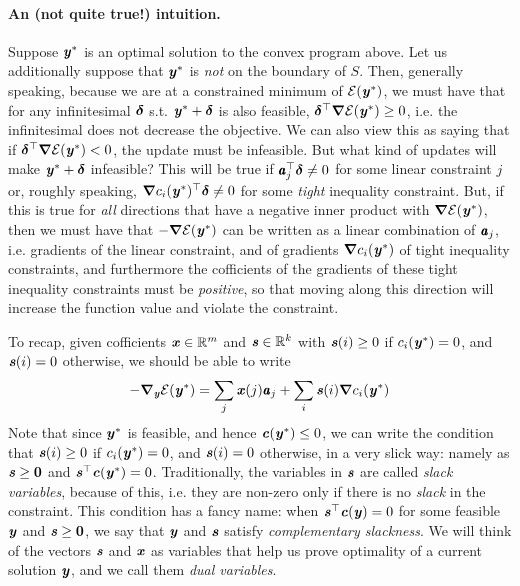 {\paragraph{An (not quite true!) intuition.}
Suppose $\yy^*$ is an optimal solution to the convex program above.
Let us additionally suppose that $\yy^*$ is \emph{not} on the boundary
of $S$.
Then, generally speaking, because we are at a constrained minimum of
$\energy(\yy^*)$, we must have that for any infinitesimal $\ddelta$
s.t. $\yy^*+\ddelta$ is also feasible, $\ddelta^{\top} \grad
\energy(\yy^*) \geq 0$, i.e. the infinitesimal does not decrease the
objective.
We can also view this as saying that if $\ddelta^{\top} \grad
\energy(\yy^*)  < 0$, the update must be infeasible.
But what kind of updates will make $\yy^*+\ddelta$ infeasible?
This will be true if $\aa_j^{\top} \ddelta \neq 0$ for some linear
constraint $j$ or, roughly speaking, $\grad c_i(\yy^*)^{\top} \ddelta \neq 0$ for some
\emph{tight} inequality constraint.
But, if this is true for \emph{all} directions that have a negative
inner product with $\grad \energy(\yy^*)$, then we must have that
$-\grad \energy(\yy^*)$ can be written as a linear combination of
$\aa_j$, i.e. gradients of the linear constraint, and of
gradients $\grad c_i(\yy^*)$ of tight inequality constraints,
and furthermore the cofficients of the gradients of these tight
inequality constraints must be \emph{positive}, so that moving along
this direction will increase the function value and violate the constraint. 

To recap, given cofficients $\xx \in \R^m$ and $\ss \in \R^k$ with
$\ss(i) \geq 0$ if $c_i(\yy^*) = 0$, and $\ss(i) = 0$ otherwise, we
should be able to write
\begin{align}
  -\grad_{\yy}\calE(\yy^*) = \sum_{j} \xx(j) \aa_j + \sum_{i}
  \ss(i)\grad c_i(\yy^*)
  \label{eq:compSlackIntro}
\end{align}
  Note that since $\yy^*$ is feasible, and hence $\cc(\yy^*) \leq 0$,
  we can write the condition that
$\ss(i) \geq 0$ if $c_i(\yy^*) = 0$, and $\ss(i) = 0$ otherwise, in a
very slick way: namely as $\ss \geq \veczero$ and $\ss^{\top}
\cc(\yy^*) = 0$.
Traditionally, the variables in $\ss$ are called \emph{slack
  variables}, because of this, i.e. they are non-zero only if there is
no \emph{slack} in the constraint. 
This condition has a fancy name: when $\ss^{\top}
\cc(\yy) = 0$ for some feasible $\yy$ and $\ss \geq \veczero$, we say
that $\yy$ and $\ss$ satisfy \emph{complementary slackness}.
%
We will think of the vectors $\ss$ and $\xx$ as variables that help
us prove optimality of a current solution $\yy$, and we call them
\emph{dual variables}.

}

